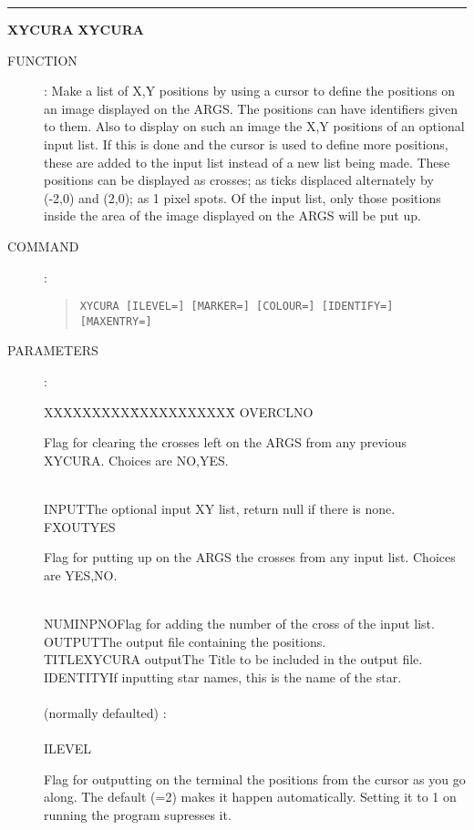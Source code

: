 \goodbreak
\rule{\textwidth}{0.3mm}
{\Large {\bf XYCURA} \hfill {\bf XYCURA}}
\begin{description}
\item [FUNCTION]:
Make a list of X,Y positions by using a cursor to define the positions on an
image displayed on the ARGS.
The positions can have identifiers given to them.
Also to display on such an image the X,Y positions of an optional input list.
If this is done and the cursor is used to define more positions, these are
added to the input list instead of a new list being made.
These positions can be displayed as crosses; as ticks displaced alternately by
(-2,0) and (2,0); as 1 pixel spots.
Of the input list, only those positions inside the area of the image displayed
on the ARGS will be put up.
\item [COMMAND]:
\begin{quote}
{\tt XYCURA  [ILEVEL=] [MARKER=] [COLOUR=] [IDENTIFY=] [MAXENTRY=]}
\end{quote}
\item [PARAMETERS] :
\begin{tabbing}
XXXXXXXXX\=XXXXXXXXXXX\=\kill
OVERCL\>NO\>\begin{minipage}[t]{100mm}
Flag for clearing the crosses left on the ARGS from any previous XYCURA.
Choices are NO,YES.
\end{minipage}\\
INPUT\>\>The optional input XY list, return null if there is none.\\
FXOUT\>YES\>\begin{minipage}[t]{100mm}
Flag for putting up on the ARGS the crosses from any input list.
Choices are YES,NO.
\end{minipage}\\
NUMINP\>NO\>Flag for adding the number of the cross of the input list.\\
OUTPUT\>\>The output file containing the positions.\\
TITLE\>XYCURA output\>The Title to be included in the output file.\\
IDENTITY\>\>If inputting star names, this is the name of the star.\\
\\
(normally defaulted) :\\
\\
ILEVEL\>\begin{minipage}[t]{100mm}
Flag for outputting on the terminal the positions from the cursor as you go
along.
The default (=2) makes it happen automatically.
Setting it to 1 on running the program supresses it.

\end{minipage}
\end{tabbing}
\end{description}
